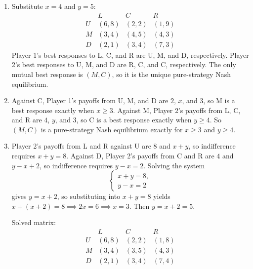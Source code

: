 \documentclass{assignment}
\begin{document}
\begin{solution}
    \begin{enumerate}
        \item[(a)] Substitute \(x=4\) and \(y=5\):
              \[
                  \begin{array}{c|ccc}
                        & L     & C     & R     \\ \hline
                      U & (6,8) & (2,2) & (1,9) \\
                      M & (3,4) & (4,5) & (4,3) \\
                      D & (2,1) & (3,4) & (7,3)
                  \end{array}
              \]
              Player 1's best responses to L, C, and R are U, M, and D,
              respectively. Player 2's best responses to U, M, and D are R, C,
              and C, respectively. The only mutual best response is \((M,C)\),
              so it is the unique pure-strategy Nash equilibrium.

        \item[(b)] Against C, Player 1's payoffs from U, M, and D are \(2\),
              \(x\), and \(3\), so M is a best response exactly when \(x\geq 3\).
              Against M, Player 2's payoffs from L, C, and R are \(4\), \(y\),
              and \(3\), so C is a best response exactly when \(y\geq 4\).
              So \((M,C)\) is a pure-strategy Nash equilibrium exactly for
              \(x\geq 3\) and \(y\geq 4\).

        \item[(c)] Player 2's payoffs from L and R against U are \(8\) and
              \(x+y\), so indifference requires \(x+y=8\). Against D, Player 2's
              payoffs from C and R are \(4\) and \(y-x+2\), so indifference
              requires \(y-x=2\). Solving the system
              \[
                  \begin{cases}
                      x+y=8, \\
                      y-x=2
                  \end{cases}
              \]
              gives \(y=x+2\), so substituting into \(x+y=8\) yields
              \(x+(x+2)=8 \implies 2x=6 \implies x=3\). Then
              \(y=x+2=5\).

              Solved matrix:
              \[
                  \begin{array}{c|ccc}
                        & L     & C     & R     \\ \hline
                      U & (6,8) & (2,2) & (1,8) \\
                      M & (3,4) & (3,5) & (4,3) \\
                      D & (2,1) & (3,4) & (7,4)
                  \end{array}
              \]


\end{enumerate}
\end{solution}
\end{document}

